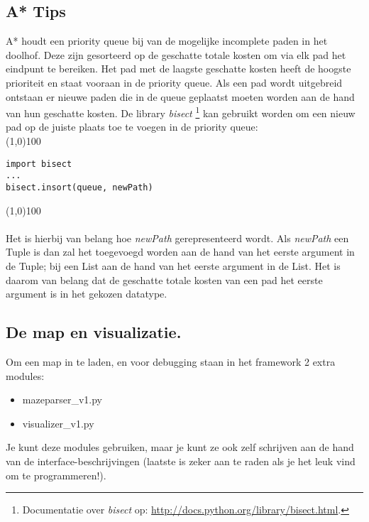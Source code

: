 \documentclass[a4paper]{article}
\begin{document}
\subsection{A* Tips}
A* houdt een priority queue bij van de mogelijke incomplete paden in het doolhof. Deze zijn gesorteerd op de geschatte totale kosten om via elk pad het eindpunt te bereiken. Het pad met de laagste geschatte kosten heeft de hoogste prioriteit en staat vooraan in de priority queue. Als een pad wordt uitgebreid ontstaan er nieuwe paden die in de queue geplaatst moeten worden aan de hand van hun geschatte kosten. De library \textit{bisect} \footnote{Documentatie over \textit{bisect} op: \url{http://docs.python.org/library/bisect.html}.} kan gebruikt worden om een nieuw pad op de juiste plaats toe te voegen in de priority queue:\\
\noindent \line(1,0){100}
\begin{verbatim}
import bisect
...
bisect.insort(queue, newPath)
\end{verbatim}
\noindent \line(1,0){100}
\\\\
Het is hierbij van belang hoe \textit{newPath} gerepresenteerd wordt. Als \textit{newPath} een Tuple is dan zal het toegevoegd worden aan de hand van het eerste argument in de Tuple; bij een List aan de hand van het eerste argument in de List. Het is daarom van belang dat de geschatte totale kosten van een pad het eerste argument is in het gekozen datatype. 

\subsection{De map en visualizatie.}
Om een map in te laden, en voor debugging staan in het framework 2 extra modules:
\begin{itemize}
\item mazeparser\_v1.py
\item visualizer\_v1.py
\end{itemize}

Je kunt deze modules gebruiken, maar je kunt ze ook zelf schrijven aan de hand van de interface-beschrijvingen (laatste is zeker aan te raden als je het leuk vind om te programmeren!).
\end{document}
